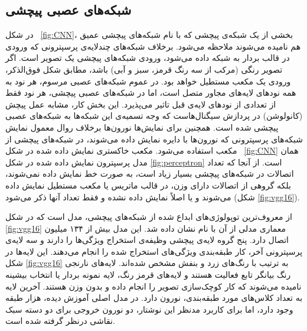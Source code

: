 \documentclass[11pt, twoside]{imsproc}
\let\LTRfootnote\footnoteA
\begin{document}
\subsection{شبکه‌های عصبی پیچشی }
\label{sec:CNNs}
در شکل
~\ref{fig:CNN}، 
بخشی از یک شبکه‌ی پیچشی که با نام شبکه‌های پیچشی عمیق هم نامیده می‌شوند ملاحظه می‌شود. برخلاف شبکه‌های چندلایه‌ی پرسپترونی که ورودی در قالب بردار به شبکه داده می‌شود، ورودی شبکه‌های پیچشی یک تصویر است. اگر تصویر رنگی (مرکب از سه رنگ قرمز، سبز و آبی) باشد، مطابق شکل فوق‌الذکر، ورودی یک مکعب مستطیل خواهد بود.
در عموم شبکه‌های عصبی مرسوم، هر نود به همه نودهای لایه‌های مجاور متصل است، اما  در شبکه‌های عصبی پیچشی، هر نود فقط از تعدادی از نودهای لایه‌ی قبل تاثیر می‌پذیرد. این بخش کار، مشابه عمل پیچش (کانولوشن)‌ در پردازش سیگنال‌هاست که وجه تسمیه‌ی این شبکه‌ها به شبکه‌های عصبی پیچشی شده است.
همچنین برای نمایش‌ها نورون‌ها برخلاف روال معمول نمایش شبکه‌های پرسپترونی که نورون‌ها با دایره نمایش داده می‌شوند، در شبکه‌های پیچشی از مکعب استفاده می‌شود. مکعب خاکستری نمایش داده شده در شکل
~\ref{fig:CNN}
همان مدل پرسپترون نمایش داده شده در شکل
\ref{fig:perceptron}
است.  از آنجا که تعداد اتصالات در شبکه‌های پیچشی بسیار زیاد است، به صورت خط نمایش داده نمی‌شوند، بلکه گروهی از اتصالات دارای وزن‌، در قالب ماتریس یا مکعب مستطیل نمایش داده می‌شوند و یا اصلاً نمایش داده نشده و فقط تعداد آنها ذکر می‌شود
(شکل 
\ref{fig:vgg16}).

  از معروف‌ترین توپولوژی‌های ابداع شده از شبکه‌های پیچشی، مدل
\cite{VGG_Simonyan15}
است که در
شکل
\ref{fig:vgg16}
معماری مدلی از آن با نام
نشان داده شد.
این مدل بیش از ۱۳۴ میلیون اتصال دارد. پنج گروه لایه‌ی پیچشی وظیفه‌ی استخراج ویژگی‌ها را دارند و سه لایه‌ی پرسپترونی آخر، کار طبقه‌بندی ویژگی‌های استخراج شده را انجام می‌دهند. این لایه‌ها در شکل
\ref{fig:vgg16}
به ترتیب با رنگ‌های زرد و بنفش مشخص شده‌اند. لایه‌های نارنجی رنگ بیانگر تابع فعالیت هستند و لایه‌های قرمز رنگ، لایه نمونه بردار یا انتخاب بیشینه %
نامیده می‌شوند که کار کوچک‌سازی تصویر را انجام داده و بدون وزن هستند. آخرین لایه به تعداد کلاس‌های مورد طبقه‌بندی، نورون دارد. در مدل اصلی آموزش دیده، هزار طبقه وجود دارد، اما برای کاربرد مدنظر این نوشتار، دو نورون خروجی برای دو دسته سبک نقاشی درنظر گرفته شده است.
\end{document}
